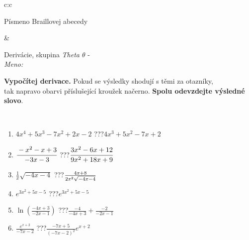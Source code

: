 \documentclass[10pt]{report}
\begin{document}
\begin{tabular}{c:c}
\begin{minipage}[c][104.5mm][t]{0.5\linewidth}
\begin{center}
\begin{minipage}{0.20\linewidth}
\begin{center}
{\small Písmeno Braillovej abecedy}
\end{center}
\end{minipage}
\end{center}
\end{minipage}
&
\begin{minipage}[c][104.5mm][t]{0.5\linewidth}
\begin{center}
\vspace{7mm}
{\huge Derivácie, skupina \textit{Theta $\theta$} -}\\[5mm]
\textit{Meno:}\phantom{xxxxxxxxxxxxxxxxxxxxxxxxxxxxxxxxxxxxxxxxxxxxxxxxxxxxxxxxxxxxxxxxx}\\[5mm]
\begin{minipage}{0.95\linewidth}
\begin{center}
\textbf{Vypočítej derivace.} Pokud se výsledky shodují s těmi za otazníky,\\tak napravo obarvi příslušející kroužek načerno. \textbf{Spolu odevzdejte výsledné slovo}.
\end{center}
\end{minipage}
\\[1mm]
\begin{minipage}{0.79\linewidth}
\begin{center}
\begin{varwidth}{\linewidth}
\begin{enumerate}
\normalsize
\item $4x^4+5x^3-7x^2+2x-2$\quad \dotfill\; ???\;\dotfill \quad $4x^3+5x^2-7x+2$
\item $\cfrac{-x^2-x+3}{-3x-3}$\quad \dotfill\; ???\;\dotfill \quad $\cfrac{3x^2-6x+12}{9x^2+18x+9}$
\item $\frac{1}{x}\sqrt{-4x-4}$\quad \dotfill\; ???\;\dotfill \quad $\frac{4x+8}{2x^2 \sqrt{\smash[b]{-4x-4}}}$
\item $e^{3x^2+5x-5}$\quad \dotfill\; ???\;\dotfill \quad $e^{3x^2+5x-5}$
\item $\ln{\left(\frac{-4x+3}{-2x-1}\right)}$\quad \dotfill\; ???\;\dotfill \quad $\frac{-4}{-4x+3}+\frac{-2}{-2x-1}$
\item $\frac{e^{x+2}}{-7x-2}$\quad \dotfill\; ???\;\dotfill \quad $\frac{-7x+5}{(-7x-2)^2}e^{x+2}$
\end{enumerate}
\end{varwidth}
\end{center}
\end{minipage}
\begin{minipage}{0.20\linewidth}
\begin{center}

\end{center}
\end{minipage}
\end{center}
\end{minipage}
\end{tabular}
\end{document}
